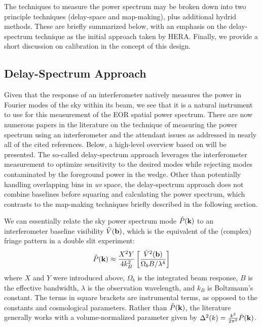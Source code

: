 \documentclass[preprint,11pt]{aastex}
\newcommand{\kvec}{{\bf k}}
\newcommand{\bvec}{{\bf b}}
\begin{document}
The techniques to measure the power spectrum may be broken down into two principle techniques (delay-space and map-making), plus additional hydrid methods.  These are briefly summarized below, with an emphasis on the delay-spectrum technique as the initial approach taken by HERA.  Finally, we provide a short discussion on calibration in the concept of this design.

\subsection{Delay-Spectrum Approach}
\label{sec:delayapproach}
Given that the response of an interferometer natively measures the power in Fourier modes of the sky within its beam, we see that it is a natural instrument to use for this measurement of the EOR spatial power spectrum.  There are now numerous papers in the literature on the technique of measuring the power spectrum using an interferometer and the attendant issues as addressed in nearly all of the cited references.  Below, a high-level overview based on  \cite{parsons_et_al2012b} will be presented. The so-called delay-spectrum approach leverages the interferometer measurement to optimize sensitivity to the desired modes while rejecting modes contaminated by the foreground power in the wedge.  Other than potentially handling overlapping bins in {\em uv} space, the delay-spectrum approach does not combine baselines before squaring and calculating the power spectrum, which contrasts to the map-making techniques briefly described in the following section.

We can essentially relate the sky power spectrum mode ${\hat P}(\kvec)$ to an interferometer baseline visibility ${\tilde V}(\bvec)$, which is the equivalent of the (complex) fringe pattern in a double slit experiment:
\begin{equation}
{\hat P}(\kvec) \approx\frac{X^2Y}{4k_B^2}   \left[\frac{{\tilde V}^2(\bvec)}{\Omega_b B/ \lambda^4} \right]
\label{eq:Pk_baseline}
\end{equation}
where $X$ and $Y$ were introduced above, $\Omega_b$ is the integrated beam response, $B$ is the effective bandwidth, $\lambda$ is the observation wavelength, and $k_B$ is Boltzmann's constant.  The terms in square brackets are instrumental terms, as opposed to the constants and cosmological parameters.  
Rather than ${\hat P}(\kvec)$, the literature generally works with a volume-normalized parameter given by $\Delta^2(k) = \frac{k^3}{2\pi^2}{\hat P}(\kvec)$.    
\end{document}

